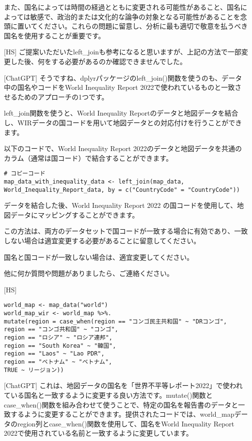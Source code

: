\documentclass[
]{book}
\theoremstyle{definition}
\theoremstyle{definition}
\theoremstyle{definition}
\theoremstyle{definition}
\theoremstyle{remark}
\begin{document}
また、国名によっては時間の経過とともに変更される可能性があること、国名によっては敏感で、政治的または文化的な論争の対象となる可能性があることを念頭に置いてください。これらの問題に留意し、分析に最も適切で敬意を払うべき国名を使用することが重要です。

{[}HS{]} ご提案いただいたleft\_joinも参考になると思いますが、上記の方法で一部変更した後、何をする必要があるのか確認できませんでした。

{[}ChatGPT{]} そうですね、dplyrパッケージのleft\_join()関数を使うのも、データ中の国名やコードをWorld Inequality Report 2022で使われているものと一致させるためのアプローチの1つです。

left\_join関数を使うと、World Inequality Reportのデータと地図データを結合し、WIRデータの国コードを用いて地図データとの対応付けを行うことができます。

以下のコードで、World Inequality Report 2022のデータと地図データを共通のカラム（通常は国コード）で結合することができます。

\begin{verbatim}
# コピーコード
map_data_with_inequality_data <- left_join(map_data, World_Inequality_Report_data, by = c("CountryCode" = "CountryCode"))
\end{verbatim}

データを結合した後、World Inequality Report 2022 の国コードを使用して、地図データにマッピングすることができます。

この方法は、両方のデータセットで国コードが一致する場合に有効であり、一致しない場合は適宜変更する必要があることに留意してください。

国名と国コードが一致しない場合は、適宜変更してください。

他に何か質問や問題がありましたら、ご連絡ください。

{[}HS{]}

\begin{verbatim}
world_map <- map_data("world")
world_map_wir <- world_map %>%. 
mutate(region = case_when(region == "コンゴ民主共和国" ~ "DRコンゴ",
region == "コンゴ共和国" ~ "コンゴ",
region == "ロシア" ~ "ロシア連邦",
region == "South Korea" ~ "韓国",
region == "Laos" ~ "Lao PDR",
region == "ベトナム" ~ "ベトナム",
TRUE ~ リージョン))
\end{verbatim}

{[}ChatGPT{]} これは、地図データの国名を「世界不平等レポート2022」で使われている国名と一致するように変更する良い方法です。mutate()関数とcase\_when()関数を組み合わせて使うことで、特定の国名を報告書のデータと一致するように変更することができます。提供されたコードでは、world\_mapデータのregion列とcase\_when()関数を使用して、国名をWorld Inequality Report 2022で使用されている名前と一致するように変更しています。
\end{document}
